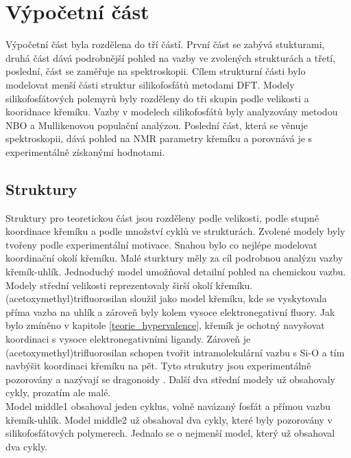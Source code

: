 \documentclass[
  digital, %
  table,   %
  lof,     %
  lot,     %
]{fithesis3}
\begin{document}
\section{Výpočetní část}
Výpočetní část byla rozdělena do tří částí. První část se zabývá stukturami, druhá část dává podrobnější pohled na vazby ve zvolených strukturách a třetí, poslední, část se zaměřuje na spektroskopii.
Cílem strukturní části bylo modelovat menší části struktur silikofosfátů metodami DFT. Modely silikofosfátových polemyrů byly rozděleny do tři skupin podle velikosti a kooridnace křemíku. Vazby v modelech silikofosfátů byly analyzovány metodou NBO a Mullikenovou populační analýzou. Poslední část, která se věnuje spektroskopii, dává pohled na NMR parametry křemíku a porovnává je s experimentálně získanými hodnotami.

\subsection{Struktury}
Struktury pro teoretickou část jsou rozděleny podle velikosti, podle stupně koordinace křemíku a podle množství cyklů ve strukturách. Zvolené modely byly tvořeny podle experimentální motivace. Snahou bylo co nejlépe modelovat koordinační okolí křemíku. Malé sturktury měly za cíl podrobnou analýzu vazby křemík-uhlík. Jednoduchý model umožňoval detailní pohled na chemickou vazbu.\\

Modely střední velikosti reprezentovaly širší okolí křemíku. (acetoxymethyl)trifluorosilan sloužil jako model křemíku, kde se vyskytovala příma vazba na uhlík a zároveň byly kolem vysoce elektronegativní fluory. Jak bylo zmíněno v kapitole \ref{teorie_hypervalence}, křemík je ochotný navyšovat koordinaci s vysoce elektronegativními ligandy. Zároveň je (acetoxymethyl)trifluorosilan schopen tvořit intramolekulární vazbu s Si-O a tím navbýšit koordinaci křemíku na pět. Tyto strukutry jsou experimentálně pozorovány a nazývají se dragonoidy \cite{Chipanina2011}. Další dva střední modely už obsahovaly cykly, prozatím ale malé. \\
Model middle1  obsahoval jeden cyklus, volně navázaný fosfát a přímou vazbu křemík-uhlík. Model middle2  už obsahoval dva cykly, které byly pozorovány v silikofosfátových polymerech. Jednalo se o nejmenší model, který už obsahoval dva cykly.\\
\end{document}

